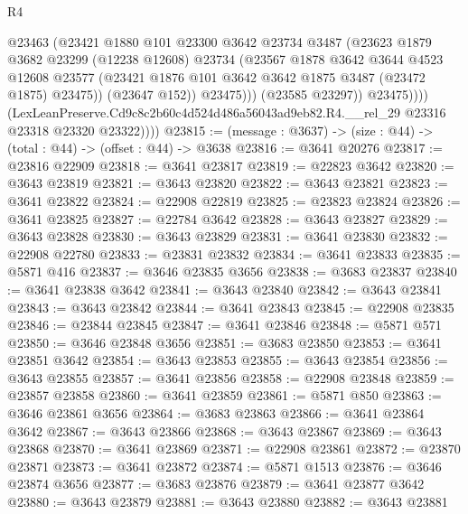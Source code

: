 \begin{lexlean}{R4}
\begin{coremodule}
                        @23463
                        (@23421
                          @1880
                          @101
                          @23300
                          @3642
                          @23734
                          @3487
                          (@23623
                            @1879
                            @3682
                            @23299
                            (@12238 @12608)
                            @23734
                            (@23567
                              @1878
                              @3642
                              @3644
                              @4523
                              @12608
                              @23577
                              (@23421 @1876 @101 @3642 @3642 @1875 @3487 (@23472 @1875) @23475))
                            (@23647 @152))
                          @23475)))
                    (@23585 @23297))
                  @23475))))
          (LexLeanPreserve.Cd9c8c2b60c4d524d486a56043ad9eb82.R4.__rel_29
            @23316
            @23318
            @23320
            @23322))))
@23815 := (message : @3637) -> (size : @44) -> (total : @44) -> (offset : @44) -> @3638
@23816 := @3641 @20276
@23817 := @23816 @22909
@23818 := @3641 @23817
@23819 := @22823 @3642
@23820 := @3643 @23819
@23821 := @3643 @23820
@23822 := @3643 @23821
@23823 := @3641 @23822
@23824 := @22908 @22819
@23825 := @23823 @23824
@23826 := @3641 @23825
@23827 := @22784 @3642
@23828 := @3643 @23827
@23829 := @3643 @23828
@23830 := @3643 @23829
@23831 := @3641 @23830
@23832 := @22908 @22780
@23833 := @23831 @23832
@23834 := @3641 @23833
@23835 := @5871 @416
@23837 := @3646 @23835 @3656
@23838 := @3683 @23837
@23840 := @3641 @23838 @3642
@23841 := @3643 @23840
@23842 := @3643 @23841
@23843 := @3643 @23842
@23844 := @3641 @23843
@23845 := @22908 @23835
@23846 := @23844 @23845
@23847 := @3641 @23846
@23848 := @5871 @571
@23850 := @3646 @23848 @3656
@23851 := @3683 @23850
@23853 := @3641 @23851 @3642
@23854 := @3643 @23853
@23855 := @3643 @23854
@23856 := @3643 @23855
@23857 := @3641 @23856
@23858 := @22908 @23848
@23859 := @23857 @23858
@23860 := @3641 @23859
@23861 := @5871 @850
@23863 := @3646 @23861 @3656
@23864 := @3683 @23863
@23866 := @3641 @23864 @3642
@23867 := @3643 @23866
@23868 := @3643 @23867
@23869 := @3643 @23868
@23870 := @3641 @23869
@23871 := @22908 @23861
@23872 := @23870 @23871
@23873 := @3641 @23872
@23874 := @5871 @1513
@23876 := @3646 @23874 @3656
@23877 := @3683 @23876
@23879 := @3641 @23877 @3642
@23880 := @3643 @23879
@23881 := @3643 @23880
@23882 := @3643 @23881

\end{coremodule}
\end{lexlean}

